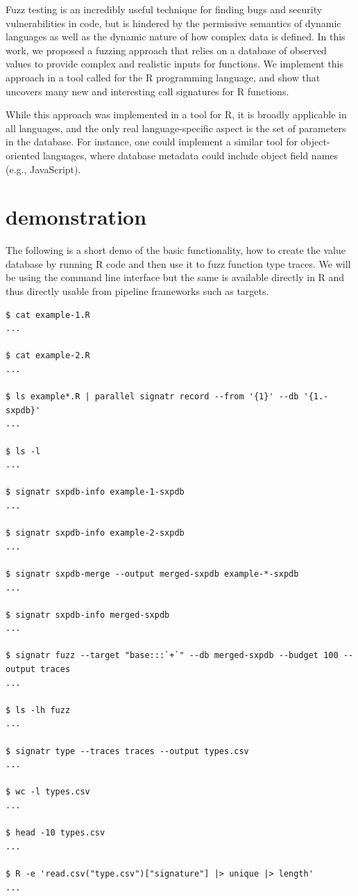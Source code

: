\documentclass[sigplan,anonymous,review]{acmart}
\begin{document}
Fuzz testing is an incredibly useful technique for finding bugs and security vulnerabilities in code, but is hindered by the permissive semantics of dynamic languages as well as the dynamic nature of how complex data is defined.
In this work, we proposed a fuzzing approach that relies on a database of observed values to provide complex and realistic inputs for functions.
We implement this approach in a tool called \tool for the R programming language, and show that \tool uncovers many new and interesting call signatures for R functions.

While this approach was implemented in a tool for R, it is broadly applicable in all languages, and the only real language-specific aspect is the set of parameters in the database.
For instance, one could implement a similar tool for object-oriented languages, where database metadata could include object field names (e.g., JavaScript).




\appendix

\section{\tool demonstration}\label{sec:demo}

The following is a short demo of the basic \tool functionality, \Ie how to create the value database by running R code and then use it to fuzz function type traces.
We will be using the command line interface but the same is available directly in R and thus directly usable from pipeline frameworks such as targets.


\begin{lstlisting}
$ cat example-1.R
...

$ cat example-2.R
...

$ ls example*.R | parallel signatr record --from '{1}' --db '{1.-sxpdb}'
...

$ ls -l
...

$ signatr sxpdb-info example-1-sxpdb
...

$ signatr sxpdb-info example-2-sxpdb
...

$ signatr sxpdb-merge --output merged-sxpdb example-*-sxpdb
...

$ signatr sxpdb-info merged-sxpdb
...

$ signatr fuzz --target "base:::`+`" --db merged-sxpdb --budget 100 --output traces
...

$ ls -lh fuzz
...

$ signatr type --traces traces --output types.csv
...

$ wc -l types.csv
...

$ head -10 types.csv
...

$ R -e 'read.csv("type.csv")["signature"] |> unique |> length'
...

\end{lstlisting}
\end{document}
